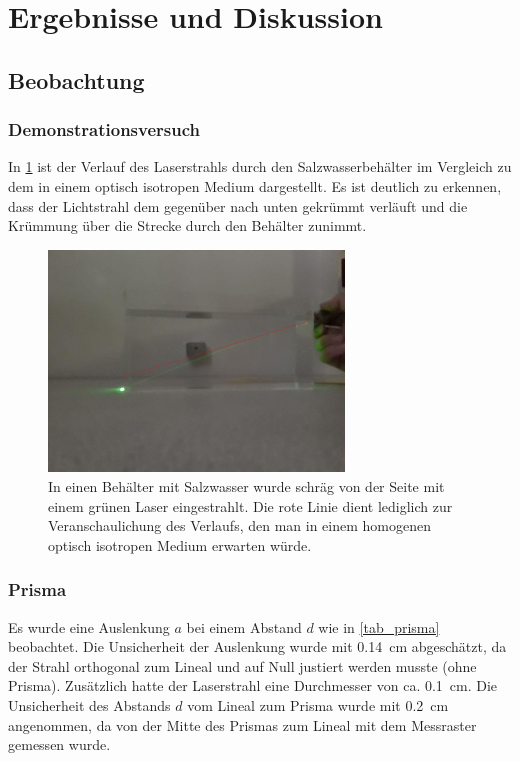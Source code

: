 \documentclass[
	a4paper,
	12pt,
	pagesize,
	ngerman
]{scrartcl}
\begin{document}
	\section{Ergebnisse und Diskussion}
	

	\subsection{Beobachtung}
	\subsubsection{Demonstrationsversuch}
	In \cref{fig_salzwasser} ist der Verlauf des Laserstrahls durch den Salzwasserbehälter im Vergleich zu dem in einem optisch isotropen Medium dargestellt.
	Es ist deutlich zu erkennen, dass der Lichtstrahl dem gegenüber nach unten gekrümmt verläuft und die Krümmung über die Strecke durch den Behälter zunimmt.

	\begin{figure}[H]
		\includegraphics[width=0.7\textwidth]{Salzwasser}
		\centering
		\caption{In einen Behälter mit Salzwasser wurde schräg von der Seite mit einem grünen Laser eingestrahlt. Die rote Linie dient lediglich zur Veranschaulichung des Verlaufs, den man in einem homogenen optisch isotropen Medium erwarten würde.} 
		\label{fig_salzwasser}
		\centering
	\end{figure}
	
	\subsubsection{Prisma} %
	Es wurde eine Auslenkung $a$ bei einem Abstand $d$ wie in \cref{tab_prisma} beobachtet.
	Die Unsicherheit der Auslenkung wurde mit \SI{0,14}{cm} abgeschätzt, da der Strahl orthogonal zum Lineal und auf Null justiert werden musste (ohne Prisma). 
	Zusätzlich hatte der Laserstrahl eine Durchmesser von ca. \SI{0,1}{cm}.
	Die Unsicherheit des Abstands $d$ vom Lineal zum Prisma wurde mit \SI{0,2}{cm} angenommen, da von der Mitte des Prismas zum Lineal mit dem Messraster gemessen wurde.
\end{document}
